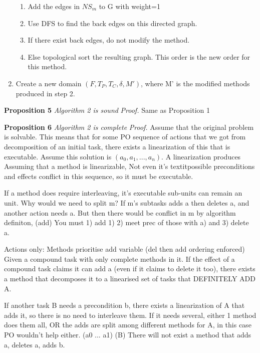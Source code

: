 \begin{enumerate}
\begin{enumerate}
		\item Add the edges in $NS_m$ to G with weight=1 \newline
		\item Use DFS to find the back edges on this directed graph.
		\item If there exist back edges, do not modify the method.
		\item Else topological sort the resulting graph. This order is the new order for this method.
	\end{enumerate}
	\item Create a new domain $(F, T_P, T_C, \delta, M')$, where M' is the modified methods produced in step 2.
\end{enumerate} 

 
\textbf{Proposition 5} \textit {Algorithm 2 is sound} \newline
\textit{Proof.} Same as Proposition 1

\textbf{Proposition 6} \textit {Algorithm 2 is complete} \newline
\textit{Proof.}
Assume that the original problem is solvable. This means that for some PO sequence of actions that we got from decomposition of an initial task, there exists a linearization of this that is executable. Assume this solution is $(a_0, a_1, ..., a_n)$. 
A linearization produces
Assuming that a method is linearizable, 
Not even it's textit{possible} preconditions and effects conflict in this sequence, so it must be executable.

If a method does require interleaving, it's executable sub-units can remain an unit.
Why would we need to split m? If m's subtasks adds a then deletes a, and another action needs a. But then there would be conflict in m
by algorithm definiton, (add)
You must 1) add 1) 2) meet prec of those with a) and 3) delete a.



Actions only:  
Methods prioritise add variable (del then add ordering enforced)
Given a compound task with only complete methods in it. 
If the effect of a compound task claims it can add a (even if it claims to delete it too), there exists a method that decomposes it to a linearised set of tasks that DEFINITELY ADD A. 

If another task B needs a precondition b, there exists a linearization of A that adds it, so there is no need to interleave them.
If it needs several, either 1 method does them all, OR the adds are split among different methods for A, in this case PO wouldn't help either.
(a0 ... a1) (B)
There will not exist a method that adds a, deletes a, adds b.

